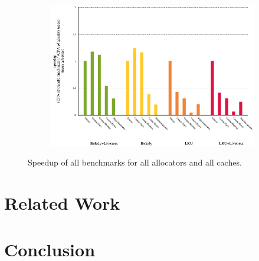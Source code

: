 \documentclass[onecolumn, openright, master, english, signatures]{dbrgrptt}
\begin{document}
\begin{figure}[!ht]
\begin{subfigure}[b]{0.5\textwidth}
  \end{subfigure}%
  \qquad
  \begin{subfigure}[b]{0.5\textwidth}%
    \includegraphics[width=\textwidth]{figs/plots/speedup-richards.eps}
  \end{subfigure}%
%
  \caption{Speedup of all benchmarks for all allocators and all caches.}
  \label{fig:speedup-overview}
\end{figure}



\chapter{Related Work}\label{cha:related-work}


\chapter{Conclusion}\label{cha:conclusion}
\end{document}
